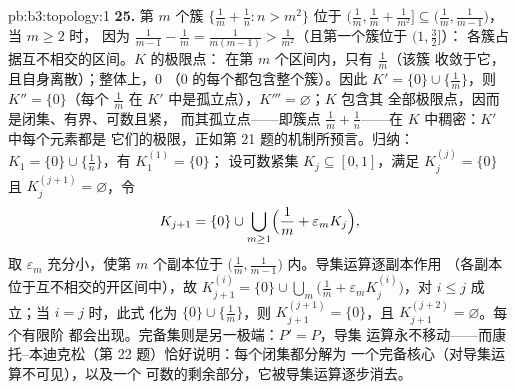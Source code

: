 \begin{solution}{pb:b3:topology:1}
\textbf{25.} 第 $m$ 个簇 $\{\frac1m + \frac1n : n >
m^2\}$ 位于 $\bigl(\frac1m, \frac1m + \frac1{m^2}\bigr]
\subseteq \bigl(\frac1m, \frac1{m-1}\bigr)$，当 $m \geq 2$ 时，
因为 $\frac1{m-1} - \frac1m = \frac1{m(m-1)} >
\frac1{m^2}$（且第一个簇位于 $(1, \frac32]$）：
各簇占据互不相交的区间。$K$ 的极限点：
在第 $m$ 个区间内，只有 $\frac1m$（该簇
收敛于它，且自身离散）；整体上，$0$
（$0$ 的每个都包含整个簇）。因此 $K'
= \{0\} \cup \{\frac1m\}$，则 $K'' = \{0\}$（每个 $\frac1m$
在 $K'$ 中是孤立点），$K''' = \varnothing$；$K$ 包含其
全部极限点，因而是闭集、有界、可数且紧，
而其孤立点——即簇点 $\frac1m +
\frac1n$——在 $K$ 中稠密：$K'$ 中每个元素都是
它们的极限，正如第 21 题的机制所预言。归纳：
$K_1 = \{0\}\cup\{\frac1n\}$，有 $K_1^{(1)} = \{0\}$；
设可数紧集 $K_j \subseteq [0, 1]$，满足 $K_j^{(j)} =
\{0\}$ 且 $K_j^{(j+1)} = \varnothing$，令
\[
K_{j+1} = \{0\} \cup \bigcup_{m \geq 1}
\Bigl(\frac1m + \varepsilon_m K_j\Bigr),
\]
取 $\varepsilon_m$ 充分小，使第 $m$ 个副本位于
$\bigl(\frac1m, \frac1{m-1}\bigr)$ 内。导集运算逐副本作用
（各副本位于互不相交的开区间中），故
$K_{j+1}^{(i)} = \{0\} \cup \bigcup_m\bigl(\frac1m +
\varepsilon_mK_j^{(i)}\bigr)$，对 $i \leq j$ 成立；当 $i = j$ 时，此式
化为 $\{0\} \cup \{\frac1m\}$，则 $K_{j+1}^{(j+1)} =
\{0\}$，且 $K_{j+1}^{(j+2)} = \varnothing$。每个有限阶
都会出现。完备集则是另一极端：$P' = P$，导集
运算永不移动——而康托–本迪克松（第
22 题）恰好说明：每个闭集都分解为
一个完备核心（对导集运算不可见），以及一个
可数的剩余部分，它被导集运算逐步消去。
\end{solution}
